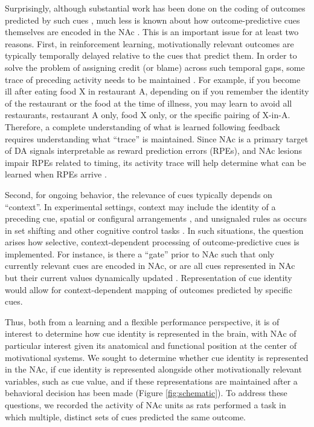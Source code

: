 \documentclass[11pt]{article}
\let\cite=\citep
\begin{document}
Surprisingly, although substantial work has been done on the coding of
outcomes predicted by such cues
\cite{Hollerman1998,Setlow2003,Nicola2004,Roitman2005,Day2006,Roesch2009a,Saddoris2011,Goldstein2012,Lansink2012,Bissonette2013,McGinty2013,Atallah2014,Sugam2014,Cooch2015,West2016},
much less is known about how outcome-predictive cues themselves are
encoded in the NAc \cite[but see;][]{Sleezer2016}. This is an important issue for
at least two reasons. First, in reinforcement learning, motivationally
relevant outcomes are typically temporally delayed relative to the
cues that predict them. In order to solve the problem of assigning
credit (or blame) across such temporal gaps, some trace of preceding
activity needs to be maintained \cite{sutton1998,Lee2012}. For
example, if you become ill after eating food X in restaurant A,
depending on if you remember the identity of the restaurant or the
food at the time of illness, you may learn to avoid all restaurants,
restaurant A only, food X only, or the specific pairing of
X-in-A. Therefore, a complete understanding of what is learned
following feedback requires understanding what “trace” is
maintained. Since NAc is a primary target of DA signals interpretable
as reward prediction errors (RPEs), and NAc lesions impair RPEs
related to timing, its activity trace will help determine what can be
learned when RPEs arrive
\cite{Ikemoto2007,McDannald2011,Hart2014,Hamid2016,Takahashi2016}.


Second, for ongoing behavior, the relevance of cues typically depends
on “context”. In experimental settings, context may include the
identity of a preceding cue, spatial or configural arrangements
\cite{Holland1992,Bouton1993,Honey2014}, and unsignaled rules as
occurs in set shifting and other cognitive control tasks
\cite{Grant1948,cohen1992context,Floresco2006a,Sleezer2016}. In such
situations, the question arises how selective, context-dependent
processing of outcome-predictive cues is implemented. For instance, is
there a “gate” prior to NAc such that only currently relevant cues are encoded in NAc, or are all cues represented in NAc but
their current values dynamically updated
\cite{Goto2008,Fitzgerald2014,Sleezer2016}. Representation of cue
identity would allow for context-dependent mapping of outcomes
predicted by specific cues.

Thus, both from a learning and a flexible performance perspective, it
is of interest to determine how cue identity is represented in the
brain, with NAc of particular interest given its anatomical and
functional position at the center of motivational systems. We sought
to determine whether cue identity is represented in the NAc, if cue
identity is represented alongside other motivationally relevant
variables, such as cue value, and if these representations are
maintained after a behavioral decision has been made (Figure
\ref{fig:schematic}). To address these questions, we recorded the
activity of NAc units as rats performed a task in which multiple,
distinct sets of cues predicted the same outcome.
\end{document}
